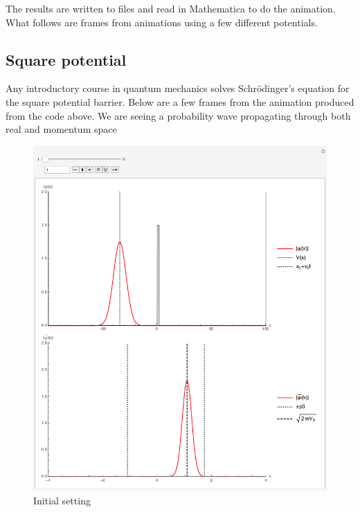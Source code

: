 \documentclass[titlepage]{article}
\begin{document}
The results are written to files and read in Mathematica to do the animation. What follows are frames from animations using a few different potentials.

\subsection{Square potential}

Any introductory course in quantum mechanics solves Schr\"odinger's equation for the square potential barrier. Below are a few frames from the animation produced from the code above. We are seeing a probability wave propagating through both real and momentum space

\begin{figure}[ht]
\centering
\includegraphics[scale=0.5,center]{images/square1.png}
\caption{Initial setting}
\label{fig:2d}
\end{figure}
\FloatBarrier
\end{document}
